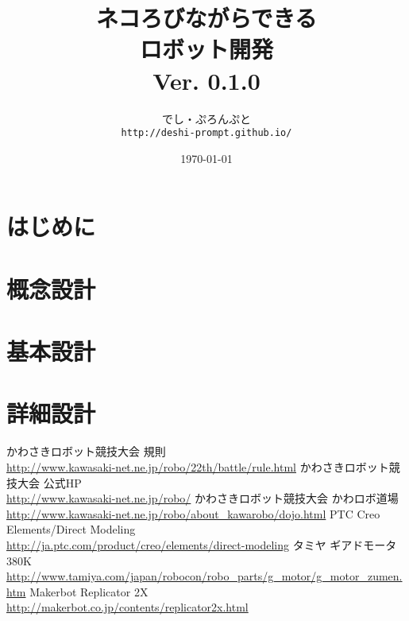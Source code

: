 \documentclass[a4paper,11pt,oneside,openany]{jsbook}
\title{{\Huge \textbf{ネコろびながらできる\\ロボット開発}}\\ {\small Ver. 0.1.0}}
\author{でし・ぷろんぷと\\ \texttt{http://deshi-prompt.github.io/}}
\date{\today}
\begin{document}
\parindent=0pt %

\thispagestyle{empty}

\frontmatter %
\tableofcontents %

\mainmatter %

\chapter{はじめに}
\thispagestyle{fancy}


\chapter{概念設計}
\thispagestyle{fancy}


\chapter{基本設計}
\thispagestyle{fancy}


\chapter{詳細設計}
\thispagestyle{fancy}


\begin{thebibliography}{20}
かわさきロボット競技大会 規則 \\ \url{http://www.kawasaki-net.ne.jp/robo/22th/battle/rule.html}
かわさきロボット競技大会 公式HP \\ \url{http://www.kawasaki-net.ne.jp/robo/}
かわさきロボット競技大会 かわロボ道場 \\ \url{http://www.kawasaki-net.ne.jp/robo/about_kawarobo/dojo.html}
PTC Creo Elements/Direct Modeling　\\ \url{http://ja.ptc.com/product/creo/elements/direct-modeling}
タミヤ ギアドモータ380K　\\ \url{http://www.tamiya.com/japan/robocon/robo_parts/g_motor/g_motor_zumen.htm}
Makerbot Replicator 2X　\\ \url{http://makerbot.co.jp/contents/replicator2x.html}


\end{thebibliography}



%
%
\end{document}
